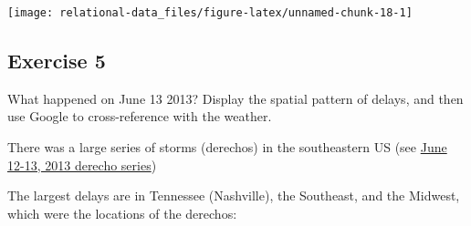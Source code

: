 \documentclass[]{book}
\newenvironment{Shaded}{\begin{snugshade}}{\end{snugshade}}
\newcommand{\DataTypeTok}[1]{\textcolor[rgb]{0.13,0.29,0.53}{#1}}
\newcommand{\KeywordTok}[1]{\textcolor[rgb]{0.13,0.29,0.53}{\textbf{#1}}}
\newcommand{\NormalTok}[1]{#1}
\newcommand{\OperatorTok}[1]{\textcolor[rgb]{0.81,0.36,0.00}{\textbf{#1}}}
\newcommand{\OtherTok}[1]{\textcolor[rgb]{0.56,0.35,0.01}{#1}}
\newcommand{\StringTok}[1]{\textcolor[rgb]{0.31,0.60,0.02}{#1}}
\theoremstyle{plain}
\theoremstyle{remark}
\theoremstyle{definition}
\theoremstyle{definition}
\theoremstyle{definition}
\theoremstyle{remark}
\begin{document}
\begin{Shaded}
\end{Shaded}

\begin{center}\texttt{[image: relational-data\_files/figure-latex/unnamed-chunk-18-1]} \end{center}

\hypertarget{exercise-5-10}{%
\subsection{Exercise 5}\label{exercise-5-10}}

What happened on June 13 2013? Display the spatial pattern of delays,
and then use Google to cross-reference with the weather.

There was a large series of storms (derechos) in the southeastern US
(see
\href{https://en.wikipedia.org/wiki/June_12\%E2\%80\%9313,_2013_derecho_series}{June
12-13, 2013 derecho series})

The largest delays are in Tennessee (Nashville), the Southeast, and the
Midwest, which were the locations of the derechos:
\end{document}
